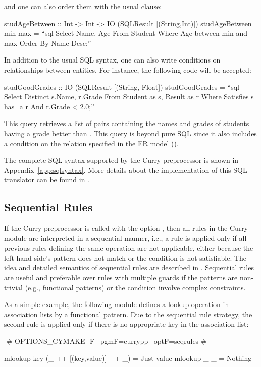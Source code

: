 and one can also order them with the usual  clause:
%
\begin{curry}
studAgeBetween :: Int -> Int -> IO (SQLResult [(String,Int)])
studAgeBetween min max =
  ``sql Select Name, Age
        From Student Where Age between {min} and {max}
        Order By Name Desc;''
\end{curry}
%
In addition to the usual SQL syntax, one can also
write conditions on relationships between entities.
For instance, the following code will be accepted:
%
\begin{curry}
studGoodGrades :: IO (SQLResult [(String, Float])
studGoodGrades = ``sql Select Distinct s.Name, r.Grade 
                       From Student as s, Result as r
                       Where Satisfies s has_a r And r.Grade < 2.0;''
\end{curry}
%
This query retrieves a list of pairs containing the
names and grades of students having a grade better than .
This query is beyond pure SQL since it also includes
a condition on the relation  specified in the ER model
().

The complete SQL syntax supported by the Curry preprocessor
is shown in Appendix~\ref{app:sqlsyntax}.
More details about the implementation of this
SQL translator can be found in \cite{HanusKrone17EPTCS,Krone15}.


\subsection{Sequential Rules}

If the Curry preprocessor is called with the option
, then all rules in the Curry module are
interpreted in a sequential manner, i.e., a rule is applied only
if all previous rules defining the same operation are not applicable,
either because the left-hand side's pattern does not match
or the condition is not satisfiable.
The idea and detailed semantics of
sequential rules are described in \cite{AntoyHanus14}.
Sequential rules are useful and preferable over
rules with multiple guards if the patterns are non-trivial
(e.g., functional patterns) or the condition involve complex
constraints.

As a simple example, the following module defines
a lookup operation in association lists by a functional pattern.
Due to the sequential rule strategy,
the second rule is applied only if there is no appropriate
key in the association list:
%
\begin{curry}
{-# OPTIONS_CYMAKE -F --pgmF=currypp --optF=seqrules #-}

mlookup key (_ ++ [(key,value)] ++ _) = Just value
mlookup _   _                         = Nothing 
\end{curry}


